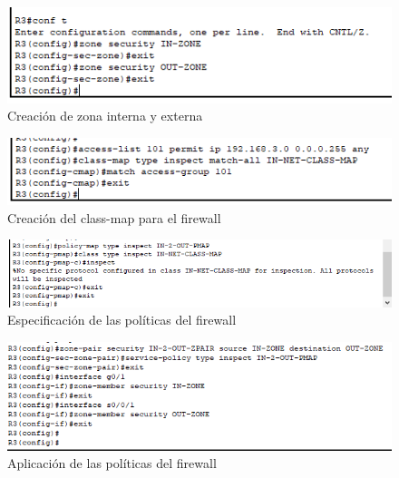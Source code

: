\documentclass[11pt]{article}
\begin{document}
        \begin{figure}[!h]
            \centering
            \includegraphics[scale=0.9]{img/part2-step-23.png}
            \caption{Creación de zona interna y externa}
            \label{fig:part2-step23}
        \end{figure}
        
        \begin{figure}[!h]
            \centering
            \includegraphics[scale=0.9]{img/part3.png}
            \caption{Creación del class-map para el firewall}
            \label{fig:part3}
        \end{figure}
        
        \clearpage
        \begin{figure}[!h]
            \centering
            \includegraphics[scale=0.85]{img/part4.png}
            \caption{Especificación de las políticas del firewall}
            \label{fig:part4}
        \end{figure}

        \begin{figure}[!h]
            \centering
            \includegraphics[scale=0.85]{img/part5.png}
            \caption{Aplicación de las políticas del firewall}
            \label{fig:part5}
        \end{figure}
        
\end{document}
